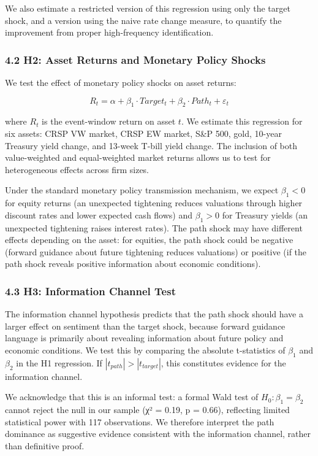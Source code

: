 \documentclass[
]{article}
\begin{document}
We also estimate a restricted version of this regression using only the
target shock, and a version using the naive rate change measure, to
quantify the improvement from proper high-frequency identification.

\subsubsection{4.2 H2: Asset Returns and Monetary Policy
Shocks}\label{h2-asset-returns-and-monetary-policy-shocks}

We test the effect of monetary policy shocks on asset returns:

\[R_t = \alpha + \beta_1 \cdot Target_t + \beta_2 \cdot Path_t + \varepsilon_t\]

where \(R_t\) is the event-window return on asset \(t\). We estimate
this regression for six assets: CRSP VW market, CRSP EW market, S\&P
500, gold, 10-year Treasury yield change, and 13-week T-bill yield
change. The inclusion of both value-weighted and equal-weighted market
returns allows us to test for heterogeneous effects across firm sizes.

Under the standard monetary policy transmission mechanism, we expect
\(\beta_1 < 0\) for equity returns (an unexpected tightening reduces
valuations through higher discount rates and lower expected cash flows)
and \(\beta_1 > 0\) for Treasury yields (an unexpected tightening raises
interest rates). The path shock may have different effects depending on
the asset: for equities, the path shock could be negative (forward
guidance about future tightening reduces valuations) or positive (if the
path shock reveals positive information about economic conditions).

\subsubsection{4.3 H3: Information Channel
Test}\label{h3-information-channel-test}

The information channel hypothesis predicts that the path shock should
have a larger effect on sentiment than the target shock, because forward
guidance language is primarily about revealing information about future
policy and economic conditions. We test this by comparing the absolute
t-statistics of \(\beta_1\) and \(\beta_2\) in the H1 regression. If
\(|t_{path}| > |t_{target}|\), this constitutes evidence for the
information channel.

We acknowledge that this is an informal test: a formal Wald test of
\(H_0: \beta_1 = \beta_2\) cannot reject the null in our sample (χ² =
0.19, p = 0.66), reflecting limited statistical power with 117
observations. We therefore interpret the path dominance as suggestive
evidence consistent with the information channel, rather than definitive
proof.
\end{document}
